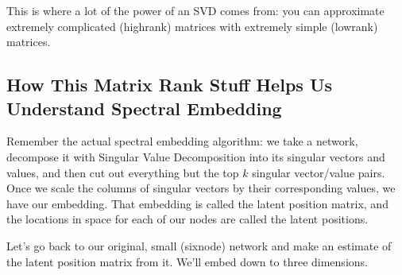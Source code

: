 \documentclass[letterpaper,10pt,english]{jupyterBook}
\begin{document}
\begin{sphinxVerbatim}[commandchars=\\\{\}]
  
  

 

\end{sphinxVerbatim}

\noindent{}

\sphinxAtStartPar
This is where a lot of the power of an SVD comes from: you can approximate extremely complicated (high\sphinxhyphen{}rank) matrices with extremely simple (low\sphinxhyphen{}rank) matrices.


\subsection{How This Matrix Rank Stuff Helps Us Understand Spectral Embedding}
\label{\detokenize{representations/ch6/spectral-embedding:how-this-matrix-rank-stuff-helps-us-understand-spectral-embedding}}
\sphinxAtStartPar
Remember the actual spectral embedding algorithm: we take a network, decompose it with Singular Value Decomposition into its singular vectors and values, and then cut out everything but the top \(k\) singular vector/value pairs. Once we scale the columns of singular vectors by their corresponding values, we have our embedding. That embedding is called the latent position matrix, and the locations in space for each of our nodes are called the latent positions.

\sphinxAtStartPar
Let’s go back to our original, small (six\sphinxhyphen{}node) network and make an estimate of the latent position matrix from it. We’ll embed down to three dimensions.
\end{document}
